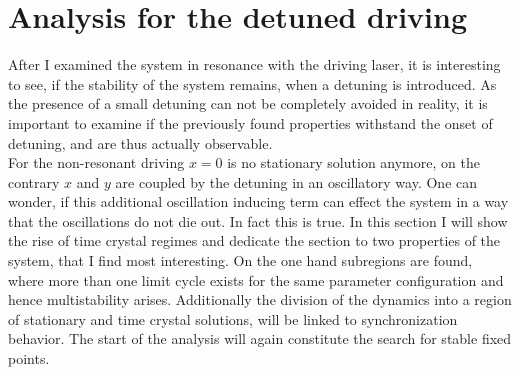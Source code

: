 \newpage
\section[Detuned driving]{Analysis for the detuned driving}\label{sec:detuned_analysis}
After I examined the system in resonance with the driving laser, it is interesting to see, if the stability of the system remains, when a detuning is introduced. As the presence of a small detuning can not be completely avoided in reality, it is important to examine if the previously found properties withstand the onset of detuning, and are thus actually observable.\\
For the non-resonant driving $x=0$ is no stationary solution anymore, on the contrary $x$ and $y$ are coupled by the detuning in an oscillatory way. One can wonder, if this additional oscillation inducing term can effect the system in a way that the oscillations do not die out. In fact this is true. In this section I will show the rise of time crystal regimes and dedicate the section to two properties of the system, that I find most interesting. On the one hand subregions are found, where more than one limit cycle exists for the same parameter configuration and hence multistability arises. Additionally the division of the dynamics into a region of stationary and time crystal solutions, will be linked to synchronization behavior. The start of the analysis will again constitute the search for stable fixed points.


